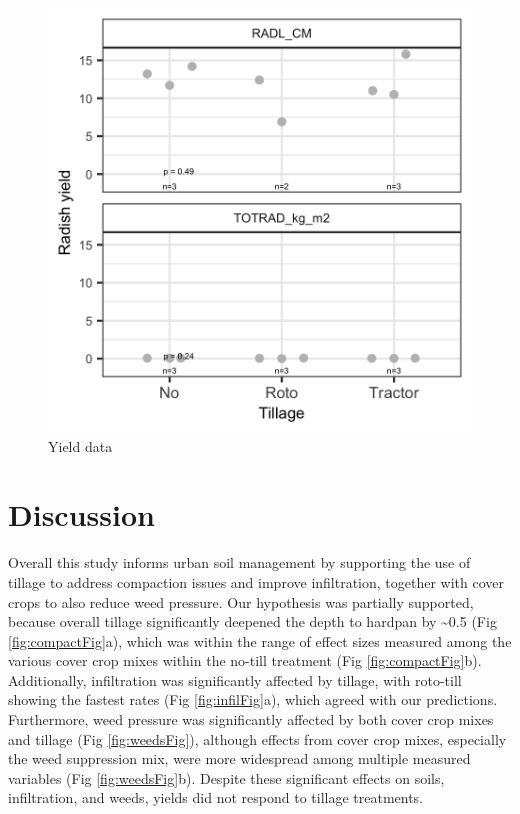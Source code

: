 \documentclass[
]{article}
\begin{document}
\begin{figure}
\includegraphics[width=12.5in]{../figs/yieldPlot} \caption{Yield data}\label{fig:yieldFig}
\end{figure}

\hypertarget{discussion}{%
\section{Discussion}\label{discussion}}

Overall this study informs urban soil management by supporting the use of tillage to address compaction issues and improve infiltration, together with cover crops to also reduce weed pressure.
Our hypothesis was partially supported, because overall tillage significantly deepened the depth to hardpan by \textasciitilde0.5 (Fig \ref{fig:compactFig}a), which was within the range of effect sizes measured among the various cover crop mixes within the no-till treatment (Fig \ref{fig:compactFig}b).
Additionally, infiltration was significantly affected by tillage, with roto-till showing the fastest rates (Fig \ref{fig:infilFig}a), which agreed with our predictions.
Furthermore, weed pressure was significantly affected by both cover crop mixes and tillage (Fig \ref{fig:weedsFig}), although effects from cover crop mixes, especially the weed suppression mix, were more widespread among multiple measured variables (Fig \ref{fig:weedsFig}b).
Despite these significant effects on soils, infiltration, and weeds, yields did not respond to tillage treatments.
\end{document}
